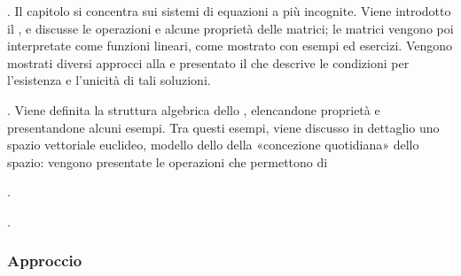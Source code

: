 \documentclass[letterpaper,10pt,italian]{jupyterBook}
\begin{document}
\sphinxAtStartPar
{\hyperref[\detokenize{ch/algebra/linear-algebra:math-hs-algebra-linear}]{}}. Il capitolo si concentra sui sistemi di equazioni  a più incognite. Viene introdotto il , e discusse le operazioni e alcune proprietà delle matrici; le matrici vengono poi interpretate come funzioni lineari, come mostrato con esempi ed esercizi. Vengono mostrati diversi approcci alla  e presentato il  che descrive le condizioni per l’esistenza e l’unicità di tali soluzioni.

\sphinxAtStartPar
{\hyperref[\detokenize{ch/algebra/vector-algebra:math-hs-algebra-vector}]{}}. Viene definita la struttura algebrica dello , elencandone proprietà e presentandone alcuni esempi. Tra questi esempi, viene discusso in dettaglio uno spazio vettoriale euclideo, modello dello della «concezione quotidiana» dello spazio: vengono presentate le operazioni che permettono di

\sphinxAtStartPar
{\hyperref[\detokenize{ch/algebra/complex-algebra:math-hs-algebra-complex}]{}}.

\sphinxAtStartPar
{}.
\subsubsection*{Approccio}
\end{document}
